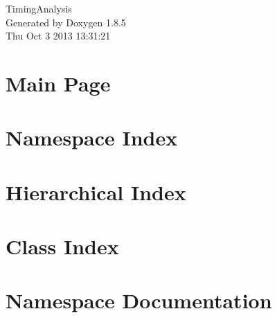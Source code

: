 \documentclass[twoside]{book}
\newcommand{\clearemptydoublepage}{%
  \newpage{\pagestyle{empty}\cleardoublepage}%
}
\begin{document}
\hypersetup{pageanchor=false}
\begin{titlepage}
\vspace*{7cm}
\begin{center}%
{\Large Timing\-Analysis }\\
\vspace*{1cm}
{\large Generated by Doxygen 1.8.5}\\
\vspace*{0.5cm}
{\small Thu Oct 3 2013 13:31:21}\\
\end{center}
\end{titlepage}
\clearemptydoublepage
\tableofcontents
\clearemptydoublepage
{}
\hypersetup{pageanchor=true}

\chapter{Main Page}
\label{index}\hypertarget{index}{}
\chapter{Namespace Index}

\chapter{Hierarchical Index}

\chapter{Class Index}

\chapter{Namespace Documentation}

\end{document}
